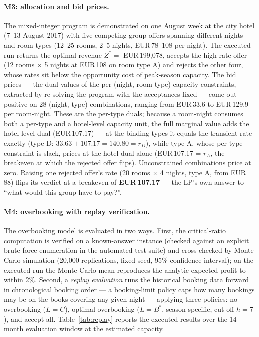 \paragraph{M3: allocation and bid prices.}
The mixed-integer program is demonstrated on one August week at the city hotel (7--13 August 2017) with five competing group offers spanning different nights and room types (12--25 rooms, 2--5 nights, EUR\,78--108 per night). The executed run returns the optimal revenue $Z^{*} = $ EUR\,199{,}078, accepts the high-rate offer (12 rooms $\times$ 5 nights at EUR\,108 on room type A) and rejects the other four, whose rates sit below the opportunity cost of peak-season capacity. The bid prices --- the dual values of the per-(night, room type) capacity constraints, extracted by re-solving the program with the acceptances fixed --- come out positive on 28 (night, type) combinations, ranging from EUR\,33.6 to
EUR\,129.9 per room-night. These are the per-type duals; because a room-night
consumes both a per-type and a hotel-level capacity unit, the full marginal
value adds the hotel-level dual (EUR\,107.17) --- at the binding types it
equals the transient rate exactly (type D: $33.63 + 107.17 = 140.80 = r_D$),
while type A, whose per-type constraint is slack, prices at the hotel dual
alone (EUR\,107.17 = $r_A$, the breakeven at which the rejected offer flips).
Unconstrained combinations price at zero. Raising one rejected offer's rate (20 rooms $\times$ 4 nights, type A, from EUR\,88) flips its verdict at a breakeven of \textbf{EUR\,107.17} --- the LP's own answer to ``what would this group have to pay?''.

\paragraph{M4: overbooking with replay verification.}
The overbooking model is evaluated in two ways. First, the critical-ratio computation is verified on a known-answer instance (checked against an explicit brute-force enumeration in the automated test suite) and cross-checked by Monte Carlo simulation (20{,}000 replications, fixed seed, 95\% confidence interval); on the executed run the Monte Carlo mean reproduces the analytic expected profit to within 2\%. Second, a \emph{replay evaluation} runs the historical booking data forward in chronological booking order --- a booking-limit policy caps how many bookings may be on the books covering any given night --- applying three policies: no overbooking ($L = C$), optimal overbooking ($L = B^{*}$, season-specific, cut-off $h = 7$), and accept-all. Table~\ref{tab:replay} reports the executed results over the 14-month evaluation window at the estimated capacity.

